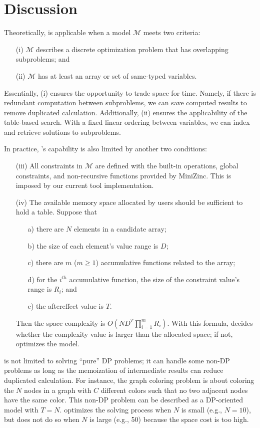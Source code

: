 \section{Discussion}

Theoretically, \tool is applicable when a model $\mathcal{M}$ meets two criteria:

\begin{enumerate}
\item[(i)] $\mathcal{M}$ describes a discrete optimization problem that has overlapping subproblems; and
\item[(ii)] $\mathcal{M}$ has at least an array or set of same-typed variables.
\end{enumerate}
Essentially, (i) ensures the opportunity to trade space for time. Namely, if there is redundant computation between subproblems, we can save computed results to remove duplicated calculation.
Additionally, (ii) ensures the applicability of the table-based search. With a fixed linear ordering between variables, we can index and retrieve solutions to subproblems.


In practice, \tool’s capability is also limited by another two conditions:

\begin{enumerate}
\item[(iii)] All constraints in $\mathcal{M}$ are defined with the built-in operations, global constraints, and non-recursive functions provided by MiniZinc. This is imposed by our current tool implementation.
\item[(iv)] The available memory space allocated by users should be sufficient to hold a table. Suppose that
\begin{itemize}
\item[a)] there are $N$ elements in a candidate array;
\item[b)] the size of each element's value range is $D$;
\item[c)] there are $m$ ($m \geq 1$) accumulative functions related to the array;
\item[d)] for the $i^{th}$ accumulative function, the size of the constraint value's range is $R_i$; and
\item[e)] the aftereffect value is $T$.
\end{itemize}
Then the space complexity is $O(N D^T \prod\limits_{i=1}^m R_i)$. With this formula, \tool decides whether the complexity value is larger than the allocated space; if not, \tool optimizes the model.
\end{enumerate}
\tool is not limited to solving ``pure'' DP problems; 
it can handle some non-DP problems as long as the memoization of intermediate results can reduce duplicated calculation. 
For instance, the graph coloring problem is about coloring the $N$ nodes in a graph with $C$ different colors such that no two adjacent nodes have the same color. 
This non-DP problem can be described as a DP-oriented model with $T=N$. \tool optimizes the solving process when $N$ is small (e.g., $N=10$), but does not do so when $N$ is large (e.g., 50) because the space cost is too high.

